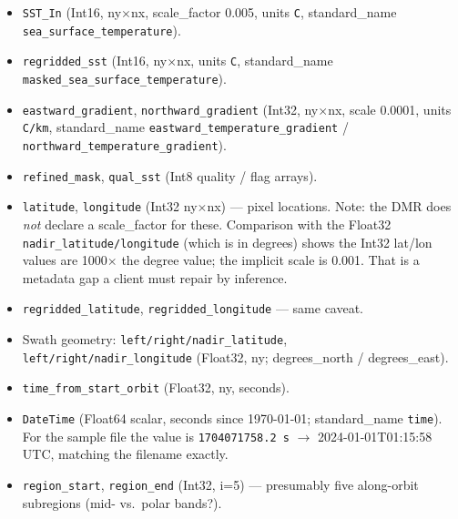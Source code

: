 \documentclass[11pt]{article}
\begin{document}
\begin{itemize}
  \item \texttt{SST\_In} (Int16, ny$\times$nx, scale\_factor 0.005,
    units \texttt{C}, standard\_name
    \texttt{sea\_surface\_temperature}).
  \item \texttt{regridded\_sst} (Int16, ny$\times$nx, units \texttt{C},
    standard\_name \texttt{masked\_sea\_surface\_temperature}).
  \item \texttt{eastward\_gradient}, \texttt{northward\_gradient}
    (Int32, ny$\times$nx, scale 0.0001, units \texttt{C/km},
    standard\_name \texttt{eastward\_temperature\_gradient} /
    \texttt{northward\_temperature\_gradient}).
  \item \texttt{refined\_mask}, \texttt{qual\_sst} (Int8 quality /
    flag arrays).
  \item \texttt{latitude}, \texttt{longitude} (Int32 ny$\times$nx) ---
    pixel locations. Note: the DMR does \emph{not} declare a
    scale\_factor for these. Comparison with the Float32
    \texttt{nadir\_latitude/longitude} (which is in degrees) shows
    the Int32 lat/lon values are 1000$\times$ the degree value; the
    implicit scale is 0.001. That is a metadata gap a client must
    repair by inference.
  \item \texttt{regridded\_latitude}, \texttt{regridded\_longitude}
    --- same caveat.
  \item Swath geometry: \texttt{left/right/nadir\_latitude},
    \texttt{left/right/nadir\_longitude} (Float32, ny;
    degrees\_north / degrees\_east).
  \item \texttt{time\_from\_start\_orbit} (Float32, ny, seconds).
  \item \texttt{DateTime} (Float64 scalar, seconds since 1970-01-01;
    standard\_name \texttt{time}). For the sample file the value is
    \texttt{1704071758.2 s} $\to$ 2024-01-01T01:15:58 UTC, matching
    the filename exactly.
  \item \texttt{region\_start}, \texttt{region\_end} (Int32, i=5) ---
    presumably five along-orbit subregions (mid- vs.\ polar bands?).
\end{itemize}
\end{document}

